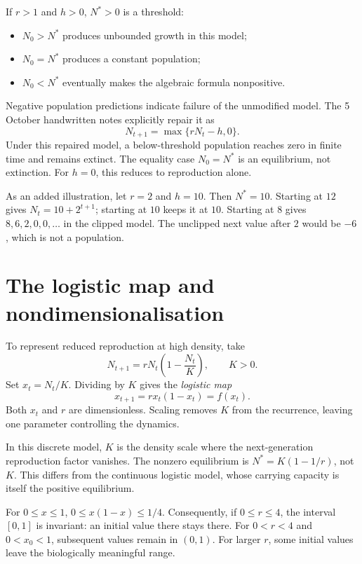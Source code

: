If $r>1$ and $h>0$, $N^*>0$ is a threshold:
\begin{itemize}
\item $N_0>N^*$ produces unbounded growth in this model;
\item $N_0=N^*$ produces a constant population;
\item $N_0<N^*$ eventually makes the algebraic formula nonpositive.
\end{itemize}
Negative population predictions indicate failure of the unmodified model.
The 5 October handwritten notes explicitly repair it as
\[
N_{t+1}=\max\{rN_t-h,0\}.
\]
Under this repaired model, a below-threshold population reaches zero in
finite time and remains extinct. The equality case $N_0=N^*$ is an
equilibrium, not extinction. For $h=0$, this reduces to reproduction alone.

\begin{example}
As an added illustration, let $r=2$ and $h=10$. Then $N^*=10$.
Starting at $12$ gives $N_t=10+2^{t+1}$; starting at $10$ keeps it at $10$.
Starting at $8$ gives $8,6,2,0,0,\ldots$ in the clipped model.
The unclipped next value after $2$ would be $-6$, which is not a population.
\end{example}

\section{The logistic map and nondimensionalisation}
To represent reduced reproduction at high density, take
\[
N_{t+1}=rN_t\left(1-\frac{N_t}{K}\right),\qquad K>0.
\]
Set $x_t=N_t/K$. Dividing by $K$ gives the \emph{logistic map}
\begin{equation}\label{eq:applied-logistic-map}
x_{t+1}=rx_t(1-x_t)=f(x_t).
\end{equation}
Both $x_t$ and $r$ are dimensionless. Scaling removes $K$ from the
recurrence, leaving one parameter controlling the dynamics.

\begin{remark}
In this discrete model, $K$ is the density scale where the next-generation
reproduction factor vanishes. The nonzero equilibrium is
$N^*=K(1-1/r)$, not $K$. This differs from the continuous logistic model,
whose carrying capacity is itself the positive equilibrium.
\end{remark}
For $0\leq x\leq1$, $0\leq x(1-x)\leq1/4$. Consequently, if
$0\leq r\leq4$, the interval $[0,1]$ is invariant: an initial value there
stays there. For $0<r<4$ and $0<x_0<1$, subsequent values remain in $(0,1)$.
For larger $r$, some initial values leave the biologically meaningful range.

